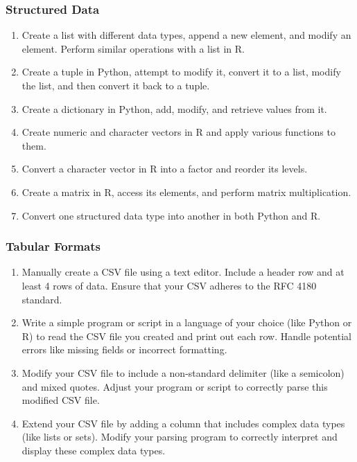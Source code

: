 \begin{withcode}
\begin{exerciseboxcomputer}
\subsubsection*{Structured Data}
\begin{enumerate}
    \item Create a list with different data types, append a new element, and modify an element. Perform similar operations with a list in R.
    \item Create a tuple in Python, attempt to modify it, convert it to a list, modify the list, and then convert it back to a tuple.
    \item Create a dictionary in Python, add, modify, and retrieve values from it.
    \item Create numeric and character vectors in R and apply various functions to them.
    \item Convert a character vector in R into a factor and reorder its levels.
    \item Create a matrix in R, access its elements, and perform matrix multiplication.
    \item Convert one structured data type into another in both Python and R.
\end{enumerate}
\end{exerciseboxcomputer}
\end{withcode}

\begin{exerciseboxcomputer}
\subsubsection*{Tabular Formats}
\begin{enumerate}
    \item Manually create a CSV file using a text editor. Include a header row and at least 4 rows of data. Ensure that your CSV adheres to the RFC 4180 standard.
    \item Write a simple program or script in a language of your choice (like Python or R) to read the CSV file you created and print out each row. Handle potential errors like missing fields or incorrect formatting.
    \item Modify your CSV file to include a non-standard delimiter (like a semicolon) and mixed quotes. Adjust your program or script to correctly parse this modified CSV file.
    \item Extend your CSV file by adding a column that includes complex data types (like lists or sets). Modify your parsing program to correctly interpret and display these complex data types.
\end{enumerate}
\end{exerciseboxcomputer}

